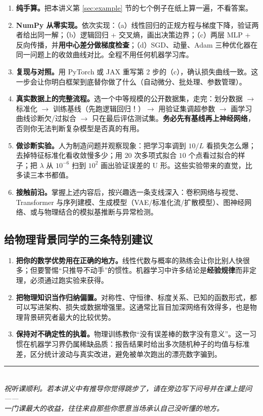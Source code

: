 \documentclass[UTF8,a4paper,11pt]{ctexart}
\theoremstyle{definition}
\theoremstyle{plain}
\theoremstyle{remark}
\begin{document}
\begin{enumerate}[label=\textbf{第 \arabic* 步：},leftmargin=5.4em]
  \item \textbf{纯手算。}把本讲义第 \ref{sec:example} 节的七个例子在纸上算一遍，不看答案。
  \item \textbf{NumPy 从零实现。}依次实现：（a）线性回归的正规方程与梯度下降，验证两者给出同一解；（b）逻辑回归 + 交叉熵，画出决策边界；（c）两层 MLP + 反向传播，并\textbf{用中心差分做梯度检查}；（d）SGD、动量、Adam 三种优化器在同一问题上的收敛曲线对比。全程不用任何机器学习库。
  \item \textbf{复现与对照。}用 PyTorch 或 JAX 重写第 2 步的（c），确认损失曲线一致。这一步会让你明白框架到底替你做了什么（自动微分、批处理、参数管理）。
  \item \textbf{真实数据上的完整流程。}选一个中等规模的公开数据集，走完：划分数据 $\to$ 标准化 $\to$ 训练基线（先跑逻辑回归！）$\to$ 用验证集调超参数 $\to$ 画学习曲线诊断欠/过拟合 $\to$ 只在最后评估测试集。\textbf{务必先有基线再上神经网络}，否则你无法判断复杂模型是否真的有用。
  \item \textbf{做诊断实验。}人为制造问题并观察现象：把学习率调到 $10/L$ 看损失怎么爆；去掉特征标准化看收敛慢多少；用 $20$ 次多项式拟合 $10$ 个点看过拟合的样子；把 $\lambda$ 从 $10^{-6}$ 扫到 $10^{2}$ 画出验证误差的 U 形。这些实验带来的直觉，比多读三本书都值。
  \item \textbf{接触前沿。}掌握上述内容后，按兴趣选一条支线深入：卷积网络与视觉、Transformer 与序列建模、生成模型（VAE/标准化流/扩散模型）、图神经网络、或与物理结合的模拟基推断与异常检测。
\end{enumerate}

\subsection{给物理背景同学的三条特别建议}

\begin{enumerate}[label=(\arabic*)]
  \item \textbf{把你的数学优势用在正确的地方。}线性代数与概率的熟练会让你比别人快很多；但要警惕“只推导不动手”的惯性。机器学习中许多结论是\textbf{经验规律}而非定理，必须通过跑实验来获得。
  \item \textbf{把物理知识当作归纳偏置。}对称性、守恒律、标度关系、已知的函数形式，都可以写进架构、损失或数据增强里。这通常比盲目加深网络有效得多，也是物理背景研究者最大的比较优势。
  \item \textbf{保持对不确定性的执着。}物理训练教你“没有误差棒的数字没有意义”。这一习惯在机器学习界仍属稀缺品质：报告结果时给出多次随机种子的均值与标准差，区分统计波动与真实改进，避免被单次跑出的漂亮数字骗到。
\end{enumerate}

\vspace{1.2em}
\begin{center}
\rule{0.5\textwidth}{0.4pt}\\[6pt]
\textit{祝听课顺利。若本讲义中有推导你觉得跳步了，请在旁边写下问号并在课上提问——\\
一门课最大的收益，往往来自那些你愿意当场承认自己没听懂的地方。}
\end{center}
\end{document}
